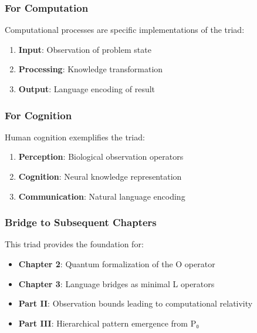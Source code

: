 \subsubsection{For Computation}\label{for-computation}

Computational processes are specific implementations of the triad:

\begin{enumerate}
\def\labelenumi{\arabic{enumi}.}
\tightlist
\item
  \textbf{Input}: Observation of problem state
\item
  \textbf{Processing}: Knowledge transformation
\item
  \textbf{Output}: Language encoding of result
\end{enumerate}

\subsubsection{For Cognition}\label{for-cognition}

Human cognition exemplifies the triad:

\begin{enumerate}
\def\labelenumi{\arabic{enumi}.}
\tightlist
\item
  \textbf{Perception}: Biological observation operators
\item
  \textbf{Cognition}: Neural knowledge representation
\item
  \textbf{Communication}: Natural language encoding
\end{enumerate}

\subsubsection{Bridge to Subsequent
Chapters}\label{bridge-to-subsequent-chapters}

This triad provides the foundation for:

\begin{itemize}
\tightlist
\item
  \textbf{Chapter 2}: Quantum formalization of the O operator
\item
  \textbf{Chapter 3}: Language bridges as minimal L operators
\item
  \textbf{Part II}: Observation bounds leading to computational
  relativity
\item
  \textbf{Part III}: Hierarchical pattern emergence from P₀
\end{itemize}

